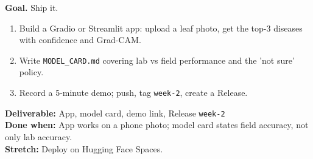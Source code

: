 \begin{tcolorbox}[enhanced,breakable,colback=white,colframe=sun,boxrule=0.8pt,arc=2pt,left=7pt,right=7pt,top=4pt,bottom=4pt,
  title={\bfseries Saturday --- Demo app and model card\hfill\normalfont\small 3 h},coltitle=white,colbacktitle=sun,fonttitle=\small]
\textbf{Goal.} Ship it.
\begin{enumerate}[itemsep=1pt,topsep=2pt]
  \item Build a Gradio or Streamlit app: upload a leaf photo, get the top-3 diseases with confidence and Grad-CAM.
  \item Write \texttt{MODEL\_CARD.md} covering lab vs field performance and the 'not sure' policy.
  \item Record a 5-minute demo; push, tag \texttt{week-2}, create a Release.
\end{enumerate}
\textbf{\color{dataC}Deliverable:} App, model card, demo link, Release \texttt{week-2}\\
\textbf{\color{navy}Done when:} App works on a phone photo; model card states field accuracy, not only lab accuracy.\\
\textbf{\color{skillC}Stretch:} Deploy on Hugging Face Spaces.
\end{tcolorbox}

